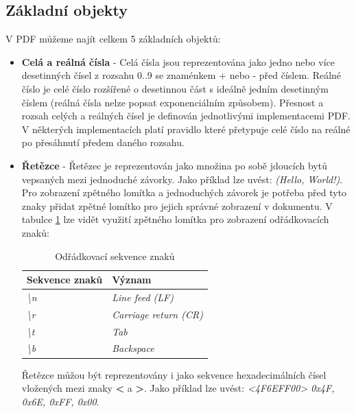 \subsection{Základní objekty}
V PDF můžeme najít celkem 5 základních objektů:
	\begin{itemize}
		\item \textbf{Celá a reálná čísla} - Celá čísla jsou reprezentována jako jedno nebo více desetinných čísel z rozsahu 0..9 se znaménkem + nebo - před číslem. Reálné číslo je celé číslo rozšířené o desetinnou část s ideálně jedním desetinným číslem (reálná čísla nelze popsat exponenciálním způsobem). Přesnost a rozsah celých a reálných čísel je definován jednotlivými implementacemi PDF. V některých implementacích platí pravidlo které přetypuje celé číslo na reálné po přesáhnutí předem daného rozsahu.
		\item \textbf{Řetězce} - Řetězec je reprezentován jako množina po sobě jdoucích bytů vepsaných mezi jednoduché závorky. Jako příklad lze uvést: \textit{(Hello, World!)}. Pro zobrazení zpětného lomítka a jednoduchých závorek je potřeba před tyto znaky přidat zpětné lomítko pro jejich správné zobrazení v dokumentu. V tabulce \ref{tab:table_escaped} lze vidět využití zpětného lomítka pro zobrazení odřádkovacích znaků:
			\begin{table}[h!]
			\centering
			\begin{tabular}{|l|l|} 
			\hline
			\textbf{Sekvence znaků}    & \textbf{Význam}                \\ 
			\hline
			\textit{\textbackslash{}n} & \textit{Line feed (LF)}        \\ 
			\hline
			\textit{\textbackslash{}r} & \textit{Carriage return (CR)}  \\ 
			\hline
			\textit{\textbackslash{}t} & \textit{Tab}                   \\ 
			\hline
			\textit{\textbackslash{}b} & \textit{Backspace}                      \\
			\hline
			\end{tabular}
			\caption{Odřádkovací sekvence znaků}
			\label{tab:table_escaped}
			\end{table}
		\newline Řetězce můžou být reprezentovány i jako sekvence hexadecimálních čísel vložených mezi znaky \textbf{<} a \textbf{>}. 
		\newline Jako příklad lze uvést: \textit{<4F6EFF00> \textrightarrow 0x4F, 0x6E, 0xFF, 0x00}.


\end{itemize}
